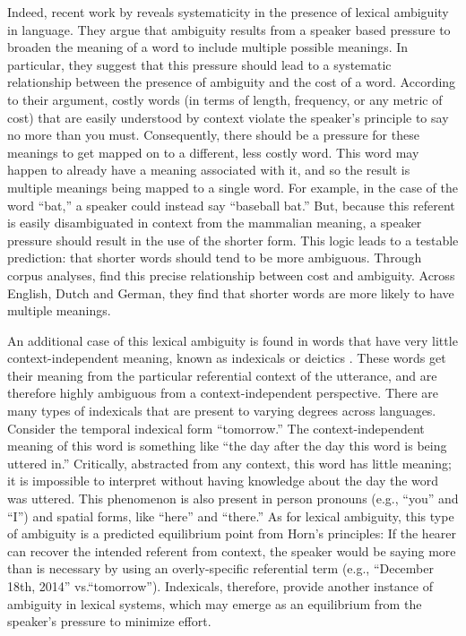 Indeed, recent work by  reveals systematicity in the presence of lexical ambiguity in language. They argue that ambiguity results from a speaker based pressure to broaden the meaning of a word to include multiple possible meanings. In particular, they suggest that this pressure should lead to a systematic relationship between the presence of ambiguity and the cost of a word. According to their argument, costly words (in terms of length, frequency, or any metric of cost) that are easily understood by context violate the speaker's principle to say no more than you must. Consequently, there should be a pressure for these meanings to get mapped on to a different, less costly word. This word may happen to already have a meaning associated with it, and so the result is multiple meanings being mapped to a single word. For example, in the case of the word ``bat,'' a speaker could instead say ``baseball bat.'' But, because this referent is easily disambiguated in context from the mammalian meaning, a speaker pressure should result in the use of the shorter form. This logic leads to a testable prediction: that shorter words should tend to be more ambiguous. Through corpus analyses,  find this precise relationship between cost and ambiguity. Across English, Dutch and German, they find that shorter words are more likely to have multiple meanings.

An additional case of this lexical ambiguity is found in words that have very little context-independent meaning, known as indexicals or deictics \cite{frawley2003international}. These words get their meaning from the particular referential context of the utterance, and are therefore highly ambiguous from a context-independent perspective. There are many types of indexicals that are present to varying degrees across languages. Consider the temporal indexical form ``tomorrow.'' The context-independent meaning of this word is something like ``the day after the day this word is being uttered in.'' Critically, abstracted from any context, this word has little meaning; it is impossible to interpret without having knowledge about the day the word was uttered. This phenomenon is also present in person pronouns (e.g., ``you'' and ``I'') and spatial forms, like ``here'' and ``there.'' As for lexical ambiguity, this type of ambiguity is a predicted equilibrium point from Horn's principles: If the hearer can recover the intended referent from context, the speaker would be saying more than is necessary by using an overly-specific referential term (e.g., ``December 18th, 2014'' vs.``tomorrow''). Indexicals, therefore, provide another instance of ambiguity in lexical systems, which may emerge as an equilibrium from the speaker's pressure to minimize effort. 

